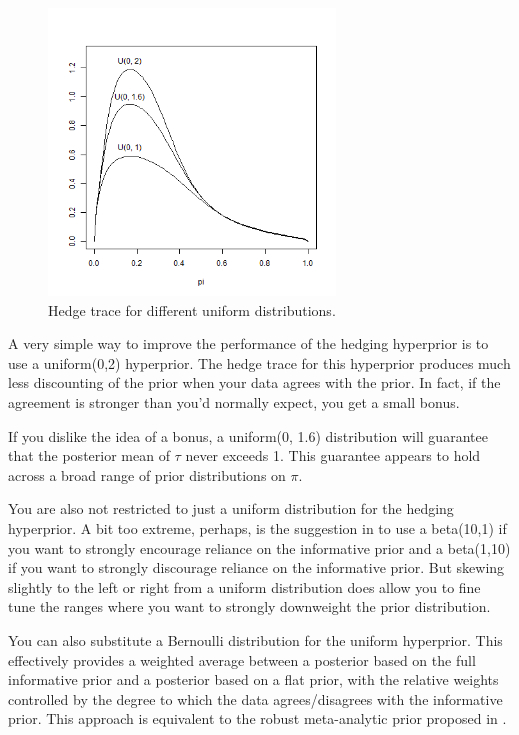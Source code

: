 \documentclass[12pt]{article}
\begin{document}
\begin{figure}
\begin{center}
\includegraphics[width=3in]{fig9.png}
\end{center}
\caption{Hedge trace for different uniform distributions. \label{fig:hedge_trace}}
\end{figure}

A very simple way to improve the performance of the hedging hyperprior is to use a  uniform(0,2) hyperprior. The hedge trace for this hyperprior produces much less discounting of the prior when your data agrees with the prior. In fact, if the agreement is stronger than you'd normally expect, you get a small bonus.

If you dislike the idea of a bonus, a uniform(0, 1.6) distribution will guarantee that the posterior mean of $\tau$ never exceeds 1. This guarantee appears to hold across a broad range of prior distributions on $\pi$.

You are also not restricted to just a uniform distribution for the hedging hyperprior. A bit too extreme, perhaps, is the suggestion in \cite{Hobbs11} to use a beta(10,1) if you want to strongly encourage reliance on the informative prior and a beta(1,10) if you want to strongly discourage reliance on the informative prior. But skewing slightly to the left or right from a uniform distribution does allow you to fine tune the ranges where you want to strongly downweight the prior distribution.

You can also substitute a Bernoulli distribution for the uniform hyperprior. This effectively provides a weighted average between a posterior based on the full informative prior and a posterior based on a flat prior, with the relative weights controlled by the degree to which the data agrees/disagrees with the informative prior. This approach is equivalent to the robust meta-analytic prior proposed in \cite{schmidli14}. 
\end{document}
